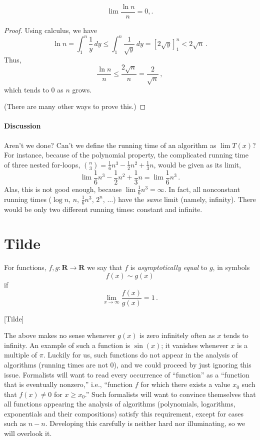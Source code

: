 \documentclass{tstextbook}
\begin{document}
\begin{theorem}\label{prop: log vs linear limit}
  \[\lim\frac{\ln n}{n} = 0,.\]
\end{theorem}
\begin{proof}
  Using calculus, we have
  \[
    \ln n =
    \int_1^n \frac1y\, dy \leq
    \int_1^n \frac{1}{\sqrt y}\, dy =
    \left [ 2\sqrt y \right]_1^n< 
    2\sqrt{n} \,.
  \]
  Thus, 
  \[ \frac{\ln n}{n} \leq \frac{2\sqrt{n}}{n} = \frac{2}{\sqrt n}\,,\]
  which tends to $0$ as $n$ grows.

  (There are many other ways to prove this.)
\end{proof}

\paragraph{Discussion} Aren't we done? Can't we define the running time of an algorithm as $\lim T(x)$?
For instance, because of the polynomial property, the complicated running time of three nested for-loops, $\binom{n}{3}=\frac16n^3 - \frac12n^2+ \frac13n$, would be given as its limit,
\[\textstyle\lim \frac16n^3 - \frac12n^2+ \frac13n = \lim\frac16n^3\,.\]
Alas, this is not good enough, because $\lim\frac16n^3= \infty$.
In fact, all nonconstant running times ($\log n$, $n$, $\frac16n^3$, $2^n$, $\ldots$) have the \emph{same} limit (namely, infinity).
There would be only two different running times: constant and infinite.

\section{Tilde}

\begin{definition}[Tilde]
For functions, \(f, g\colon \mathbf R \rightarrow \mathbf R\) we say that \(f\) is \emph{asymptotically equal} to \(g\), in symbols \[f(x)\sim g(x)\]
if 
\[ \lim_{x \rightarrow \infty} \frac{f(x)}{g(x)}  = 1\,.\]
\end{definition}[Tilde]


\begin{example}
The above makes no sense whenever \(g(x)\) is zero infinitely often as \(x\) tends to infinity.
An example of such a function is \(\sin (x)\); it vanishes whenever \(x\) is a multiple of \(\pi\).
Luckily for us, such functions do not appear in the analysis of algorithms (running times are not 0), and we could proceed by just ignoring this issue.
Formalists will want to read every occurrence of “function” as a “function that is eventually nonzero,” i.e., “function  \(f\) for which there exists a value \(x_0\) such that \(f(x) \neq 0\) for \(x\geq x_0\).”
Such formalists will want to convince themselves that all functions appearing the analysis of algorithms (polynomials, logarithms, exponentials and their compositions) satisfy this requirement, except for cases such as \(n- n\).
Developing this carefully is neither hard nor illuminating, so we will overlook it.
\end{example}
\end{document}
